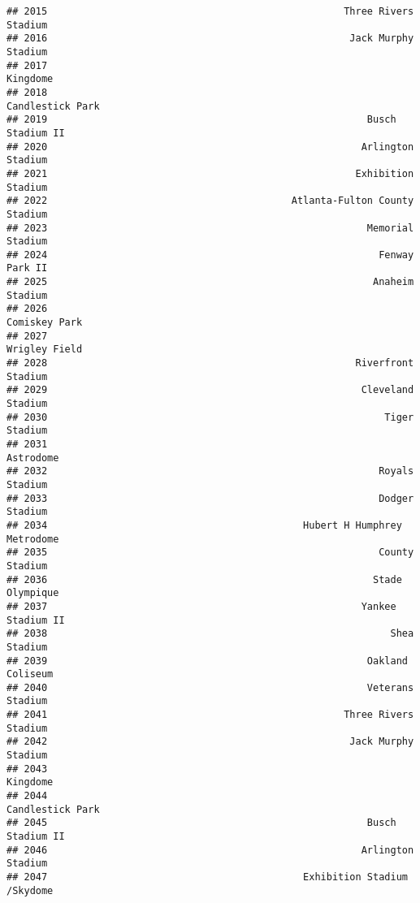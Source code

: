 \documentclass[]{article}
\begin{document}
\begin{verbatim}
## 2015                                                   Three Rivers Stadium
## 2016                                                    Jack Murphy Stadium
## 2017                                                               Kingdome
## 2018                                                       Candlestick Park
## 2019                                                       Busch Stadium II
## 2020                                                      Arlington Stadium
## 2021                                                     Exhibition Stadium
## 2022                                          Atlanta-Fulton County Stadium
## 2023                                                       Memorial Stadium
## 2024                                                         Fenway Park II
## 2025                                                        Anaheim Stadium
## 2026                                                          Comiskey Park
## 2027                                                          Wrigley Field
## 2028                                                     Riverfront Stadium
## 2029                                                      Cleveland Stadium
## 2030                                                          Tiger Stadium
## 2031                                                              Astrodome
## 2032                                                         Royals Stadium
## 2033                                                         Dodger Stadium
## 2034                                            Hubert H Humphrey Metrodome
## 2035                                                         County Stadium
## 2036                                                        Stade Olympique
## 2037                                                      Yankee Stadium II
## 2038                                                           Shea Stadium
## 2039                                                       Oakland Coliseum
## 2040                                                       Veterans Stadium
## 2041                                                   Three Rivers Stadium
## 2042                                                    Jack Murphy Stadium
## 2043                                                               Kingdome
## 2044                                                       Candlestick Park
## 2045                                                       Busch Stadium II
## 2046                                                      Arlington Stadium
## 2047                                            Exhibition Stadium /Skydome

\end{verbatim}
\end{document}
